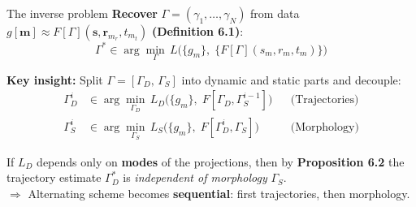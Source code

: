 \documentclass{beamer}
\begin{document}
    \begin{frame}{The inverse problem}
        \textbf{Recover} $\Gamma = (\gamma_1, \ldots, \gamma_N)$ from data $g[\mathbf{m}] \approx F[\Gamma](\mathbf{s}, \mathbf{r}_{m_r}, t_{m_t})$ \textbf{(Definition 6.1)}:
        $$
            \Gamma^* \in \arg\min_{\Gamma}\, L\bigl(\{g_m\},\; \{F[\Gamma](s_m, r_m, t_m)\}\bigr)
        $$

        \pause
        \vspace{0.3em}
        \textbf{Key insight:} Split $\Gamma = [\Gamma_D,\, \Gamma_S]$ into dynamic and static parts and decouple:
        \begin{align*}
            \Gamma_D^i &\in \arg\min_{\Gamma_D}\, L_D\bigl(\{g_m\},\; F[\Gamma_D, \Gamma_S^{i-1}]\bigr)
            && \text{(Trajectories)} \\[4pt]
            \Gamma_S^i &\in \arg\min_{\Gamma_S}\, L_S\bigl(\{g_m\},\; F[\Gamma_D^i, \Gamma_S]\bigr)
            && \text{(Morphology)}
        \end{align*}

        \vspace{0.3em}
        If $L_D$ depends only on \textbf{modes} of the projections, then by \textbf{Proposition 6.2} the trajectory estimate $\Gamma_D^*$ is \emph{independent of morphology} $\Gamma_S$. \\[3pt]
        $\Rightarrow$ Alternating scheme becomes \textbf{sequential}: first trajectories, then morphology.

    \end{frame}
\end{document}

